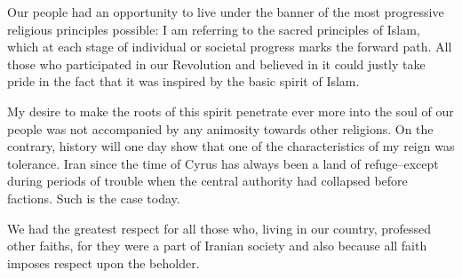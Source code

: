 Our people had an opportunity to live under the banner of the most progressive religious principles possible: I am referring to the sacred principles of Islam, which at each stage of individual or societal progress marks the forward path. All those who participated in our Revolution and believed in it could justly take pride in the fact that it was inspired by the basic spirit of Islam. 

My desire to make the roots of this spirit penetrate ever more into the soul of our people was not accompanied by any animosity towards other religions. On the contrary, history will one day show that one of the characteristics of my reign was tolerance. Iran since the time of Cyrus has always been a land of refuge--except during periods of trouble when the central authority had collapsed before factions. Such is the case today. 

We had the greatest respect for all those who, living in our country, professed other faiths, for they were a part of Iranian society and also because all faith imposes respect upon the beholder. 